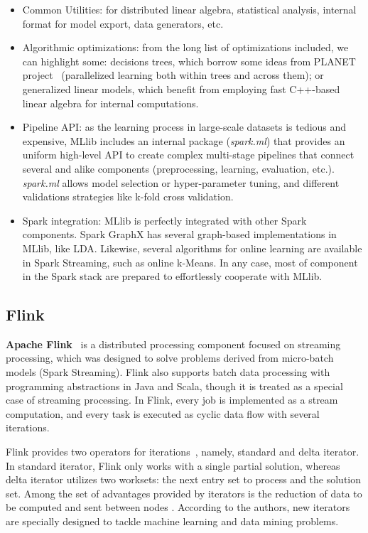 \documentclass[3p,review]{elsarticle}
\begin{document}
\begin{itemize}
	\item Common Utilities: for distributed linear algebra, statistical analysis, internal format for model export, data generators, etc. 
	\item Algorithmic optimizations: from the long list of optimizations included, we can highlight some: decisions trees, which borrow some ideas from PLANET project~\cite{panda09} (parallelized learning both within trees and across them); or generalized linear models, which benefit from employing fast C++-based linear algebra for internal computations.
	\item Pipeline API: as the learning process in large-scale datasets is tedious and expensive, MLlib includes an internal package (\emph{spark.ml}) that provides an uniform high-level API to create complex multi-stage pipelines that connect several and alike components (preprocessing, learning, evaluation, etc.). \emph{spark.ml} allows model selection or hyper-parameter tuning, and different validations strategies like k-fold cross validation.
	\item Spark integration: MLlib is perfectly integrated with other Spark components. Spark GraphX has several graph-based implementations in MLlib, like LDA. Likewise, several algorithms for online learning are available in Spark Streaming, such as online k-Means. In any case, most of component in the Spark stack are prepared to effortlessly cooperate with MLlib.
\end{itemize}

\subsection{Flink}\label{subsec:flink}

\textbf{Apache Flink}~\cite{flink} is a distributed processing component focused on streaming processing, which was designed to solve problems derived from micro-batch models (Spark Streaming). Flink also supports batch data processing with programming abstractions in Java and Scala, though it is treated as a special case of streaming processing. In Flink, every job is implemented as a stream computation, and every task is executed as cyclic data flow with several iterations. 

Flink provides two operators for iterations~\cite{flinkengine}, namely, standard and delta iterator. In standard iterator, Flink only works with a single partial solution, whereas delta iterator utilizes two worksets: the next entry set to process and the solution set.
Among the set of advantages provided by iterators is the reduction of data to be computed and sent between nodes \cite{EwenTKM12}. According to the authors, new iterators are specially designed to tackle machine learning and data mining problems.
\end{document}
